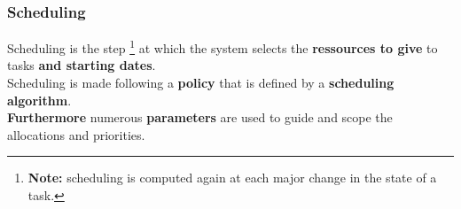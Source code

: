 \documentclass{beamer}
\begin{document}
\begin{frame}
	\frametitle{Scheduling}
	
	Scheduling is the step \footnote{{\bf Note:} scheduling is computed again at each major change in the state of a task.}
at which the system selects the {\bf ressources to give} to tasks {\bf and starting dates}.
\\[0.4cm]
	Scheduling is made following a {\bf policy} that is defined by a {\bf scheduling algorithm}.
\\[0.4cm]
	{\bf Furthermore} numerous {\bf parameters} are used to guide and scope the allocations and priorities.
 

\end{frame}


\end{document}
